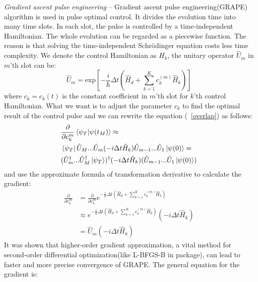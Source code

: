 \textit{Gradient ascent pulse engineering} -- Gradient ascent pulse engineering(GRAPE) algorithm is used in pulse optimal control. It divides the evolution time into many time slots. In each slot, the pulse is controlled by a time-independent Hamiltonian. The whole evolution can be regarded as a piecewise function. The reason is that solving the time-independent Schrödinger equation costs less time complexity. We denote the control Hamiltonian as $H_{k}$, the unitary operator $\hat{U}_{m}$ in $m$'th slot can be:
\begin{equation}
    \hat{U}_{m}=\mathrm{exp}\left[-\frac{i}{\hbar}\Delta t\left(\hat{H}_{d}+\sum_{k=1}^{K}c_{k}^{(m)}\hat{H}_{k}\right)\right]
\end{equation}
where $c_{k}=c_{k}(t)$ is the constant coefficient in $m$'th slot for $k$'th control Hamiltonian. What we want is to adjust the parameter $c_{k}$ to find the optimal result of the control pulse and we can rewrite the equation (~\ref{overlap}) as follows:
\begin{equation}
    \begin{split}
        &\frac{\partial}{\partial c_{k}^{m}}\braket{\psi_{T}|\psi(t_M)}\approx\\
        &\bra{\psi_{T}}\hat{U}_{M}...\hat{U}_{m}(-i\Delta t\hat{H}_{k})\hat{U}_{m-1}...\hat{U}_{1}\ket{\psi(0)}=\\
        &(\hat{U}_{m}^{\dagger}...\hat{U}_{M}^{\dagger}\ket{\psi_{T}})^{\dagger}(-i\Delta t\hat{H}_{k})(\hat{U}_{m-1}...\hat{U}_{1}\ket{\psi(0)})
    \end{split}
\end{equation}
and use the approximate formula of transformation derivative to calculate the gradient:
\begin{equation}
    \begin{split}
        \frac{\partial}{\partial c_{k}^{m}}&=\frac{\partial}{\partial c_{k}^{m}}e^{-\frac{i}{\hbar}\Delta t\left(\hat{H}_{d}+\sum_{k=1}^{K}c_{k}^{(m)}\hat{H}_{k}\right)}\\
        &\approx e^{-\frac{i}{\hbar}\Delta t\left(\hat{H}_{d}+\sum_{k=1}^{K}c_{k}^{(m)}\hat{H}_{k}\right)}(-i\Delta t\hat{H}_{k})\\
        &=\hat{U}_{m}(-i\Delta t\hat{H}_{k})
    \end{split}
\end{equation}
It was shown that higher-order gradient approximation, a vital method for second-order differential optimization(like L-BFGS-B in package), can lead to faster and more precise convergence of GRAPE. The general equation for the gradient is:
